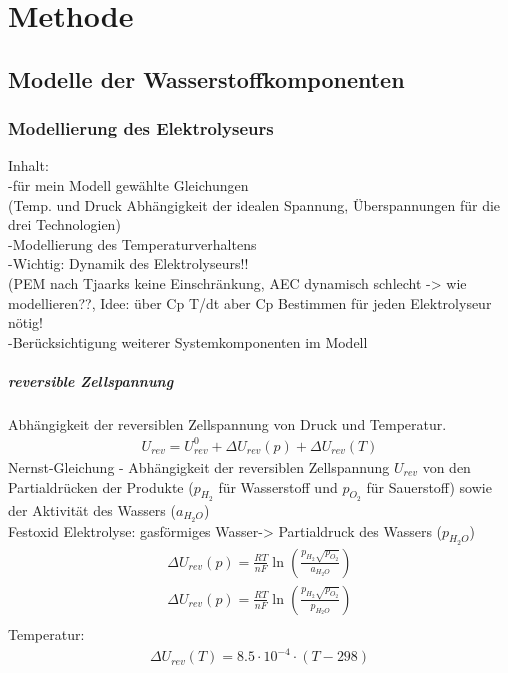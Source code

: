 \chapter{Methode}
\label{cha:Methode}

\section{Modelle der Wasserstoffkomponenten}

\subsection{Modellierung des Elektrolyseurs}
 Inhalt:\\
-für mein Modell gewählte Gleichungen\\
(Temp. und Druck Abhängigkeit der idealen Spannung, Überspannungen für die drei Technologien)\\ 
-Modellierung des Temperaturverhaltens\\
-Wichtig: Dynamik des Elektrolyseurs!!\\
(PEM nach Tjaarks keine Einschränkung, AEC dynamisch schlecht -> wie modellieren??, Idee: über Cp T/dt aber Cp Bestimmen für jeden Elektrolyseur nötig!\\ 
-Berücksichtigung weiterer Systemkomponenten im Modell


\paragraph{reversible Zellspannung}
Abhängigkeit der reversiblen Zellspannung von Druck und Temperatur.\\
\begin{align}
U_{rev} = U^0_{rev} + \Delta U_{rev}(p) + \Delta U_{rev}(T)
\end{align}
Nernst-Gleichung - Abhängigkeit der reversiblen Zellspannung $U_{rev}$ von den Partialdrücken der Produkte ($p_{H_2}$ für Wasserstoff und $p_{O_2}$ für Sauerstoff) sowie der Aktivität des Wassers ($a_{H_{2}O}$)\\
Festoxid Elektrolyse: gasförmiges Wasser-> Partialdruck des Wassers ($p_{H_{2}O}$) 
\begin{align}
 \Delta U_{rev}(p) = \frac{RT}{nF}\ln{(\frac{p_{H_2}\sqrt{p_{O_2}}}{a_{H_{2}O}})} \\ 
 \Delta U_{rev}(p) = \frac{RT}{nF}\ln{(\frac{p_{H_2}\sqrt{p_{O_2}}}{p_{H_{2}O}})} \\
\end{align}
Temperatur:\\
\begin{align}
	\Delta U_{rev}(T) = 8.5 \cdot 10^{-4} \cdot (T-298)
\end{align}

